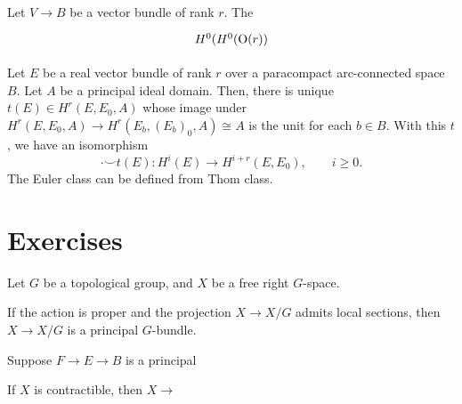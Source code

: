 \documentclass{../../large}
\begin{document}
\begin{prb}
Let $V\to B$ be a vector bundle of rank $r$.
The 
\[\begin{tikzcd}
H^0(H^0(\rO(r))
\end{tikzcd}\]
\end{prb}


\begin{prb}
\end{prb}

\begin{prb}
Let $E$ be a real vector bundle of rank $r$ over a paracompact arc-connected space $B$.
Let $A$ be a principal ideal domain.
Then, there is unique $t(E)\in H^r(E,E_0,A)$ whose image under $H^r(E,E_0,A)\to H^r(E_b,(E_b)_0,A)\cong A$ is the unit for each $b\in B$.
With this $t$, we have an isomorphism
\[\cdot\smile t(E):H^i(E)\to H^{i+r}(E,E_0),\qquad i\ge0.\]
The Euler class can be defined from Thom class.
\end{prb}

\section*{Exercises}

\begin{prb}
Let $G$ be a topological group, and $X$ be a free right $G$-space.
\begin{parts}
\item If the action is proper and the projection $X\to X/G$ admits local sections, then $X\to X/G$ is a principal $G$-bundle.
\end{parts}
\end{prb}

\begin{prb}
	
\end{prb}

\begin{prb}
Suppose $F\to E\to B$ is a principal 
\begin{parts}
\item If $X$ is contractible, then $X\to$
\end{parts}
\end{prb}
\end{document}
